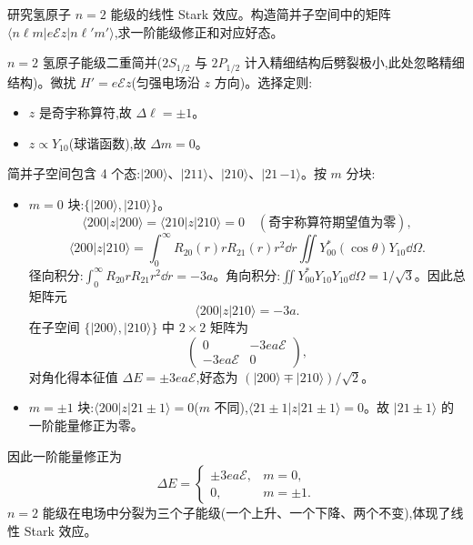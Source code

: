 \begin{question}
研究氢原子 $n=2$ 能级的线性 Stark 效应。构造简并子空间中的矩阵 $\langle n\ell m|e\mathcal Ez|n\ell' m'\rangle$,求一阶能级修正和对应好态。
\end{question}
\begin{solution}
$n=2$ 氢原子能级二重简并($2S_{1/2}$ 与 $2P_{1/2}$ 计入精细结构后劈裂极小,此处忽略精细结构)。微扰 $H'=e\mathcal Ez$(匀强电场沿 $z$ 方向)。选择定则:
\begin{itemize}
\item $z$ 是奇宇称算符,故 $\Delta\ell=\pm1$。
\item $z\propto Y_{10}$(球谐函数),故 $\Delta m=0$。
\end{itemize}

简并子空间包含 4 个态:$|200\rangle$、$|211\rangle$、$|210\rangle$、$|21\,{-1}\rangle$。按 $m$ 分块:
\begin{itemize}
\item $m=0$ 块:$\{|200\rangle,|210\rangle\}$。
  \[
  \langle200|z|200\rangle = \langle210|z|210\rangle = 0\quad(\text{奇宇称算符期望值为零}),
  \]
  \[
  \langle200|z|210\rangle = \int_0^\infty R_{20}(r)r R_{21}(r)r^2\dd r\iint Y_{00}^*(\cos\theta)Y_{10}\dd\Omega.
  \]
  径向积分:$\int_0^\infty R_{20}rR_{21}r^2\dd r = -3a$。角向积分:$\iint Y_{00}^*Y_{10}Y_{10}\dd\Omega = 1/\sqrt3$。因此总矩阵元
  \[
  \langle200|z|210\rangle = -3a.
  \]
  在子空间 $\{|200\rangle,|210\rangle\}$ 中 $2\times2$ 矩阵为
  \[
  \begin{pmatrix}0 & -3ea\mathcal E\\ -3ea\mathcal E & 0\end{pmatrix},
  \]
  对角化得本征值 $\Delta E = \pm 3ea\mathcal E$,好态为 $(|200\rangle\mp|210\rangle)/\sqrt2$。

\item $m=\pm1$ 块:$\langle200|z|21\pm1\rangle = 0$($m$ 不同),$\langle21\pm1|z|21\pm1\rangle=0$。故 $|21\pm1\rangle$ 的一阶能量修正为零。
\end{itemize}

因此一阶能量修正为
\[
\boxed{\Delta E = \begin{cases}
\pm 3ea\mathcal E, & m=0,\\ 0, & m=\pm1.
\end{cases}}
\]
$n=2$ 能级在电场中分裂为三个子能级(一个上升、一个下降、两个不变),体现了线性 Stark 效应。
\end{solution}

